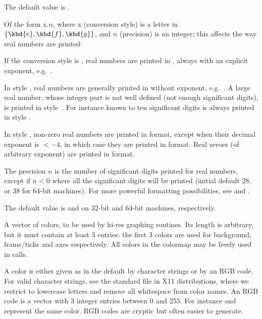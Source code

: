 {The default value is .

\label{se:def,format}
Of the form x$.n$, where x (conversion style)
is a letter in $\{\kbd{e},\kbd{f},\kbd{g}\}$, and $n$ (precision) is an
integer; this affects the way real numbers are printed:

\item If the conversion style is , real numbers are printed in
, always with an explicit exponent,
e.g.~.

\item In style , real numbers are generally printed in
 without exponent, e.g.~. A
large real number, whose integer part is not well defined (not enough
significant digits), is printed in style~. For instance
 known to ten significant digits is always printed in style
.

\item In style , non-zero real numbers are printed in  format,
except when their decimal exponent is $< -4$, in which case they are printed
in  format. Real zeroes (of arbitrary exponent) are printed in 
format.

The precision $n$ is the number of significant digits printed for real
numbers, except if $n<0$ where all the significant digits will be printed
(initial default 28, or 38 for 64-bit machines). For more powerful formatting
possibilities, see  and .

The default value is  and  on 32-bit and
64-bit machines, respectively.

\label{se:def,graphcolormap}
A vector of colors, to be
used by hi-res graphing routines. Its length is arbitrary, but it must
contain at least 3 entries: the first 3 colors are used for background,
frame/ticks and axes respectively. All colors in the colormap may be freely
used in  calls.

A color is either given as in the default by character strings or by an RGB
code. For valid character strings, see the standard  file in X11
distributions, where we restrict to lowercase letters and remove all
whitespace from color names. An RGB code is a vector with 3 integer entries
between 0 and 255. For instance \kbd{[250, 235, 215]} and
 represent the same color. RGB codes are cryptic but
often easier to generate.

}
